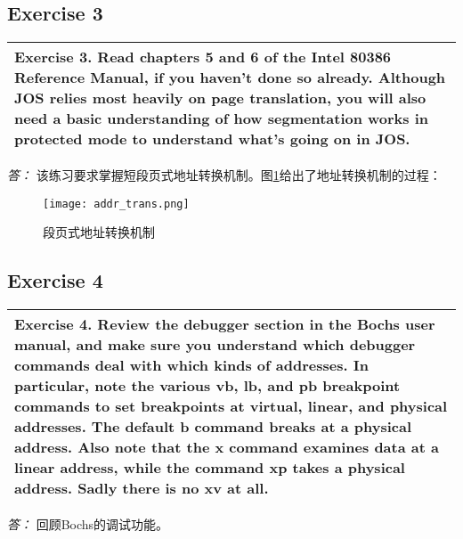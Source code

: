 \documentclass[11pt,a4paper]{article}
\begin{document}
\subsection{Exercise 3}
\begin{tabular}{|p{\textwidth}|}
\hline
Exercise 3.  Read chapters 5 and 6 of the  Intel 80386 Reference Manual, if you haven't done so already. Although JOS relies most heavily on page translation, you will also need a basic understanding of how segmentation works in protected mode to understand what's going on in JOS. \\
\hline
\end{tabular}
\textit{\large{答：}}
该练习要求掌握短段页式地址转换机制。图\ref{address}给出了地址转换机制的过程：\\
\begin{figure}[h]
\begin{center}
\texttt{[image: addr\_trans.png]}
\end{center}
\caption{段页式地址转换机制}\label{address}
\end{figure}

\subsection{Exercise 4}
\begin{tabular}{|p{\textwidth}|}
\hline
Exercise 4.  Review the  debugger section in the  Bochs user manual, and make sure you understand which debugger commands deal with which kinds of addresses. In particular, note the various vb, lb, and pb breakpoint commands to set breakpoints at virtual, linear, and physical addresses. The default b command breaks at a physical address. Also note that the x command examines data at a linear address, while the command xp takes a physical address. Sadly there is no xv at all. \\
\hline
\end{tabular}
\textit{\large{答：}}
回顾Bochs的调试功能。\\
\end{document}
